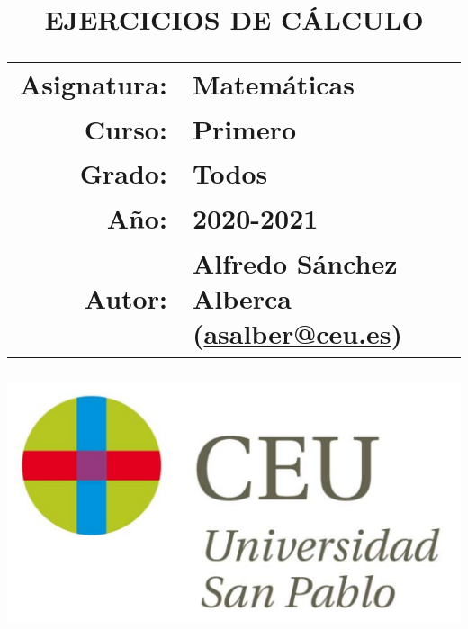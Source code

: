 \documentclass[a4paper,titlepage]{article}
\begin{document}
\sloppy

\title{\vskip 2cm
\Huge \textbf{\textsf{\quad \textcolor{blueceu}{EJERCICIOS DE CÁLCULO}\quad}}\\
   \vskip 1cm
\Large \sffamily
\begin{tabular}{rl}
\textcolor{blueceu}{Asignatura:} & Matemáticas\\
\textcolor{blueceu}{Curso:} & Primero\\
\textcolor{blueceu}{Grado:} &  Todos\\
\textcolor{blueceu}{Año:} & 2020-2021\\
\textcolor{blueceu}{Autor:} & Alfredo S\'anchez Alberca (\url{asalber@ceu.es})
\end{tabular}
}

\author{}
\date{\includegraphics[scale=0.3]{img/logo_uspceu_01}}

\maketitle
\newpage
\tableofcontents
\newpage


\end{document}
